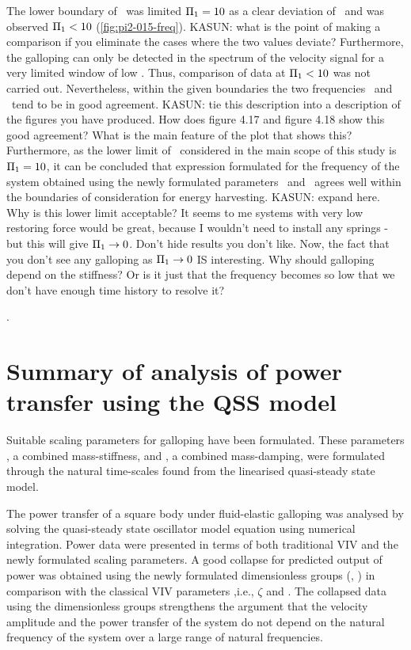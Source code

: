 The lower boundary of \massstiff\ was limited $\Pi_1=10$ as a clear deviation of \freqlin\ and \freqdns was observed $\Pi_1<10$ (\ref{fig:pi2-015-freq}). KASUN: what is the point of making a comparison if you eliminate the cases where the two values deviate? Furthermore, the galloping can only be detected in the spectrum of the velocity signal for a very limited window of low \massdamp. Thus, comparison of data at $\Pi_1<10$ was not carried out. Nevertheless, within the given boundaries the two frequencies \freqlin\ and \freqdns\ tend to be in good agreement. KASUN: tie this description into a description of the figures you have produced. How does figure 4.17 and figure 4.18 show this good agreement? What is the main feature of the plot that shows this? Furthermore, as the lower limit of \massstiff\ considered in the main scope of this study is $\Pi_1=10$, it can be concluded that expression formulated for the frequency of the system obtained using the newly formulated parameters \massstiff\ and \massdamp\ agrees well within the boundaries of consideration for energy harvesting. KASUN: expand here. Why is this lower limit acceptable? It seems to me systems with very low restoring force would be great, because I wouldn't need to install any springs - but this will give $\Pi_1 \rightarrow 0$. Don't hide results you don't like. Now, the fact that you don't see any galloping as $\Pi_1 \rightarrow 0$ IS interesting. Why should galloping depend on the stiffness? Or is it just that the frequency becomes so low that we don't have enough time history to resolve it?
	

. %


\section{Summary of analysis of power transfer using the QSS model}
\label{sec:summary-pi_1-pi_2}

Suitable scaling parameters for galloping have been formulated. These parameters \massstiff, a combined mass-stiffness, and \massdamp, a combined mass-damping, were formulated through the natural time-scales found from the linearised quasi-steady state model.   

The power transfer of a square body under fluid-elastic galloping was analysed by solving the quasi-steady state oscillator model equation using numerical  integration. Power data were presented in terms of both traditional VIV and the newly formulated scaling parameters. A good collapse for predicted output of power was obtained using the newly formulated  dimensionless groups (\massstiff, \massdamp) in comparison with the classical VIV parameters ,i.e., $\zeta$ and \ustar. The collapsed data using the dimensionless groups strengthens the argument that the velocity amplitude and the power transfer of the system do not depend on the natural frequency of the system over a large range of natural frequencies.

